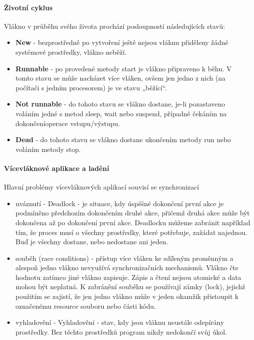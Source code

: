 \documentclass[10pt,a4paper]{article}
\begin{document}
\paragraph{Životní cyklus} 
Vlákno v průběhu svého života prochází posloupností následujících stavů:

\begin{itemize}
\item \textbf{New} - bezprostředně po vytvoření ještě nejsou vláknu přiděleny žádné systémové prostředky, vlákno neběží.
\item \textbf{Runnable} - po provedené metody start je vlákno připraveno k běhu. V tomto stavu se může nacházet více vláken, ovšem jen jedno z nich (na počítači s jedním procesorem) je ve stavu „běžící“.
\item \textbf{Not runnable} - do tohoto stavu se vlákno dostane, je-li pozastaveno voláním jedné s metod sleep, wait nebo suspend, případně čekáním na dokončeníoperace vstupu/výstupu.
\item \textbf{Dead} - do tohoto stavu se vlákno dostane ukončením metody run nebo voláním metody stop.
\end{itemize}
\paragraph{Vícevláknové aplikace a ladění}
Hlavní problémy vícevláknových aplikací souvisí se synchronizací

\begin{itemize}
\item uváznutí - Deadlock - je situace, kdy úspěšné dokončení první akce je podmíněno předchozím dokončením druhé akce, přičemž druhá akce může být dokončena až po dokončení první akce. Deadlocku můžeme zabránit například tím, že proces musí o všechny prostředky, které potřebuje, zažádat najednou. Buď je všechny dostane, nebo nedostane ani jeden. 
\item souběh (race conditions) - přístup více vláken ke sdíleným proměnným a alespoň jedno vlákno nevyužívá synchronizačních mechanismů. Vlákno čte hodnotu zatímco jiné vlákno zapisuje. Zápis a čtení nejsou atomické a data mohou být neplatná. K zabránění souběhu se používají zámky (lock), jejichž použitím se zajistí, že jen jedno vlákno může v jeden okamžik přistoupit k označenému resource souboru nebo části kódu.
\item vyhladovění - Vyhladovění - stav, kdy jsou vláknu neustále odepírány prostředky. Bez těchto prostředků program nikdy nedokončí svůj úkol.
\end{itemize}
\end{document}
